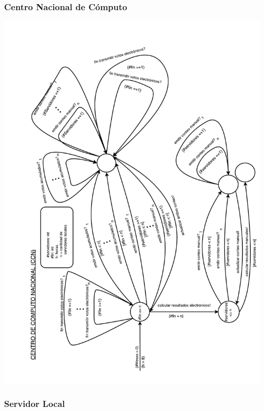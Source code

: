\documentclass[spanish, 10pt,a4paper]{article}
\numberwithin{equation}{section} %
\begin{document}
\par 
\subsubsection{Centro Nacional de Cómputo}
\vspace{\baselineskip}
    \begin{center}
                \includegraphics[scale=0.75, page=1]{imagenes/fsm/FSMCCN.pdf}
                \\
                \vspace{1pt}
                \footnotesize\textit{}
        \end{center}
\vspace{\baselineskip}
\vspace{-10px}

\subsubsection{Servidor Local}
\end{document}
